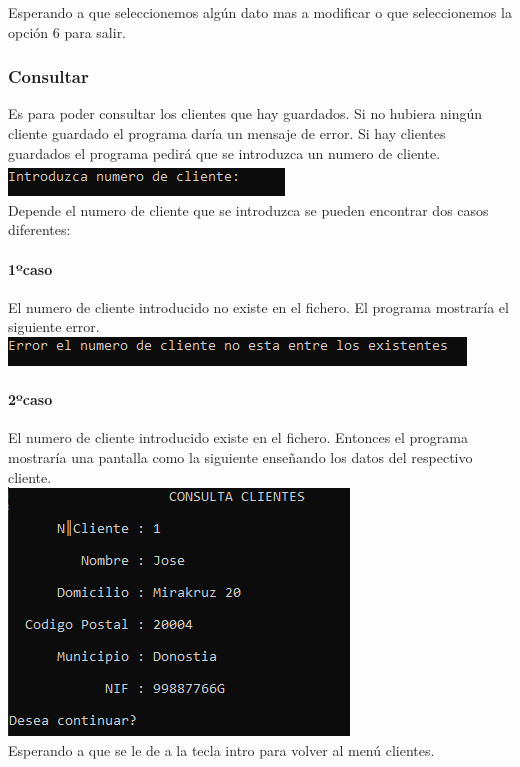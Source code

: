 \documentclass[12pt]{article}
\begin{document}
        Esperando a que seleccionemos algún dato mas a modificar o que seleccionemos la opción 6 para salir.
\subsubsection{Consultar}
    Es para poder consultar los clientes que hay guardados. Si no hubiera ningún cliente guardado el programa daría un mensaje de error. Si hay clientes guardados el programa pedirá que se introduzca un numero de cliente.\\
    \includegraphics[]{PedirNumeroDeCliente.PNG}\\
     Depende el numero de cliente que se introduzca se pueden encontrar dos casos diferentes:
     \paragraph{1ºcaso}
     El numero de cliente introducido no existe en el fichero. El programa mostraría el siguiente error.\\
    \includegraphics[]{ErrorNumeroClientesNoExistente.PNG}
    \paragraph{2ºcaso}
    El numero de cliente introducido existe en el fichero. Entonces el programa mostraría una pantalla como la siguiente enseñando los datos del respectivo cliente.\\
    \includegraphics[]{PantallaConsultaClientesMostrandoCliente.PNG}\\
    Esperando a que se le de a la tecla intro para volver al menú clientes.
\end{document}
